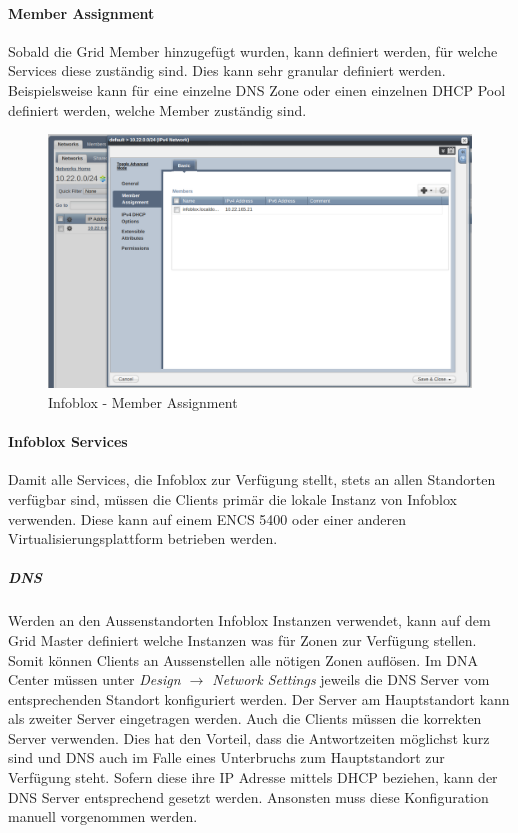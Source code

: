 \paragraph{Member Assignment}

Sobald die Grid Member hinzugefügt wurden, kann definiert werden, für welche Services diese zuständig sind. Dies kann sehr granular definiert werden. Beispielsweise kann für eine einzelne DNS Zone oder einen einzelnen DHCP Pool definiert werden, welche Member zuständig sind.

\begin{figure}[H]
	\centering
	\includegraphics[width=1\linewidth]{img/Absicherung/Infoblox_Member_Assignment.png}
	\caption{Infoblox - Member Assignment}
	\label{fig:Infoblox - Member Assignment}
\end{figure}

\paragraph{Infoblox Services}

Damit alle Services, die Infoblox zur Verfügung stellt, stets an allen Standorten verfügbar sind, müssen die Clients primär die lokale Instanz von Infoblox verwenden. Diese kann auf einem ENCS 5400 oder einer anderen Virtualisierungsplattform betrieben werden.

\subparagraph{DNS}

Werden an den Aussenstandorten Infoblox Instanzen verwendet, kann auf dem Grid Master definiert welche Instanzen was für Zonen zur Verfügung stellen. Somit können Clients an Aussenstellen alle nötigen Zonen auflösen.
Im DNA Center müssen unter \textit{Design $\rightarrow$ Network Settings} jeweils die DNS Server vom entsprechenden Standort konfiguriert werden. Der Server am Hauptstandort kann als zweiter Server eingetragen werden.
Auch die Clients müssen die korrekten Server verwenden. Dies hat den Vorteil, dass die Antwortzeiten möglichst kurz sind und DNS auch im Falle eines Unterbruchs zum Hauptstandort zur Verfügung steht. Sofern diese ihre IP Adresse mittels DHCP beziehen, kann der DNS Server entsprechend gesetzt werden. Ansonsten muss diese Konfiguration manuell vorgenommen werden.

